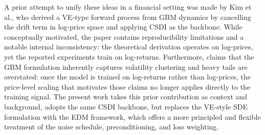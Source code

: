 A prior attempt to unify these ideas in a financial setting was made by Kim et al.\cite{kim2025diffusion}, who derived a VE-type forward process from GBM dynamics by cancelling the drift term in log-price space and applying CSDI as the backbone. While conceptually motivated, the paper contains reproducibility limitations and a notable internal inconsistency: the theoretical derivation operates on log-prices, yet the reported experiments train on log-returns. Furthermore, claims that the GBM formulation inherently captures volatility clustering and heavy tails are overstated: once the model is trained on log-returns rather than log-prices, the price-level scaling that motivates those claims no longer applies directly to the training signal. The present work takes this prior contribution as context and background, adopts the same CSDI backbone, but replaces the VE-style SDE formulation with the EDM framework, which offers a more principled and flexible treatment of the noise schedule, preconditioning, and loss weighting.